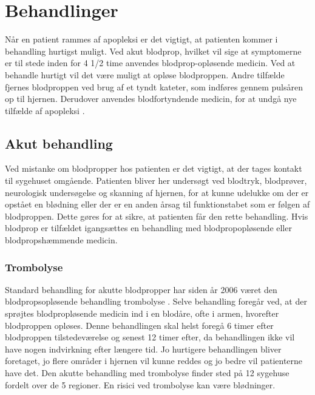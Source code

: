 \section{Behandlinger}
Når en patient rammes af apopleksi er det vigtigt, at patienten kommer i behandling hurtigst muligt. Ved akut blodprop, hvilket vil sige at symptomerne er til stede inden for 4 1/2 time anvendes blodprop-opløsende medicin. Ved at behandle hurtigt vil det være muligt at opløse blodproppen. Andre tilfælde fjernes blodproppen ved brug af et tyndt kateter, som indføres gennem pulsåren op til hjernen. Derudover anvendes blodfortyndende medicin, for at undgå nye tilfælde af apopleksi \cite{Hjerteforeningen2014} \cite{Sundhed2014}.

\subsection{Akut behandling}
Ved mistanke om blodpropper hos patienten er det vigtigt, at der tages kontakt til sygehuset omgående. Patienten bliver her undersøgt ved blodtryk, blodprøver, neurologisk undersøgelse og skanning af hjernen, for at kunne udelukke om der er opstået en blødning eller der er en anden årsag til funktionstabet som er følgen af blodproppen. Dette gøres for at sikre, at patienten får den rette behandling. Hvis blodprop er tilfældet igangsættes en behandling med blodpropopløsende eller blodpropshæmmende medicin. \cite{Hjerteforeningen2014} \cite{Sundhed2014} 

\subsubsection{Trombolyse}
Standard behandling for akutte blodpropper har siden år 2006 været den blodpropsopløsende behandling trombolyse \cite{Hjernesagen2015b}. Selve behandling foregår ved, at der sprøjtes blodpropløsende medicin ind i en blodåre, ofte i armen, hvorefter blodproppen opløses. Denne behandlingen skal helst foregå 6 timer efter blodproppen tilstedeværelse og senest 12 timer efter, da behandlingen ikke vil have nogen indvirkning efter længere tid. Jo hurtigere behandlingen bliver foretaget, jo flere områder i hjernen vil kunne reddes og jo bedre vil patienterne have det. Den akutte behandling med trombolyse finder sted på 12 sygehuse fordelt over de 5 regioner. En risici ved trombolyse kan være blødninger.\cite{Hjernesagen2015b} 

